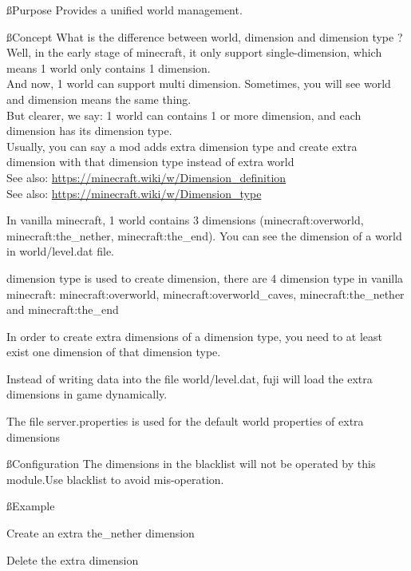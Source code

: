
\ss{Purpose}
Provides a unified world management.

\ss{Concept}
What is the difference between world, dimension and dimension type ?\\
Well, in the early stage of minecraft, it only support single-dimension, which means 1 world only contains 1 dimension.\\
And now, 1 world can support multi dimension.
Sometimes, you will see world and dimension means the same thing.\\
But clearer, we say: 1 world can contains 1 or more dimension, and each dimension has its dimension type.\\
Usually, you can say a mod adds extra dimension type and create extra dimension with that dimension type instead of extra world\\
See also: \url{https://minecraft.wiki/w/Dimension_definition}\\
See also: \url{https://minecraft.wiki/w/Dimension_type}

In vanilla minecraft, 1 world contains 3 dimensions (minecraft:overworld, minecraft:the\_nether, minecraft:the\_end). You can see the dimension of a world in world/level.dat file.


dimension type is used to create dimension, there are 4 dimension type in vanilla minecraft: minecraft:overworld, minecraft:overworld\_caves, minecraft:the\_nether and minecraft:the\_end


In order to create extra dimensions of a dimension type, you need to at least exist one dimension of that dimension type.

Instead of writing data into the file world/level.dat, fuji will load the extra dimensions in game dynamically.

The file server.properties is used for the default world properties of extra dimensions

\ss{Configuration}
The dimensions in the blacklist will not be operated by this module.Use blacklist to avoid mis-operation.

\ss{Example}
\begin{example}{Create an extra the\_nether dimension}
\end{example}

\begin{example}{Delete the extra dimension}
\end{example}

